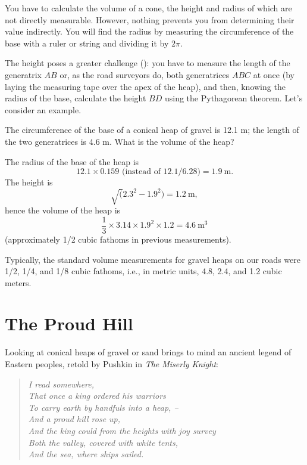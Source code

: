 You have to calculate the volume of a cone, the height and radius of which are not directly measurable. However, nothing prevents you from determining their value indirectly. You will find the radius by measuring the circumference of the base with a ruler or string and dividing it by $2\pi$. 

The height poses a greater challenge (): you have to measure the length of the generatrix $AB$ or, as the road surveyors do, both generatrices $ABC$ at once (by laying the measuring tape over the apex of the heap), and then, knowing the radius of the base, calculate the height $BD$ using the Pythagorean theorem. Let's consider an example.

\ques The circumference of the base of a conical heap of gravel is 12.1 m; the length of the two generatrices is 4.6 m. What is the volume of the heap?

\ans The radius of the base of the heap is 
\begin{equation*}%
12.1 \times 0.159 \,\, \text{(instead of 12.1/6.28)} = \SI{1.9}{\meter}.
\end{equation*}
The height is 
\begin{equation*}%
\sqrt(2.3^{2} - 1.9^{2}) =  \SI{1.2}{\meter},
\end{equation*}
hence the volume of the heap is 
\begin{equation*}%
\frac{1}{3} \times 3.14 \times 1.9^{2} \times 1.2 =  \SI{4.6}{\meter\cubed}
\end{equation*}
(approximately 1/2 cubic fathoms in previous measurements).

Typically, the standard volume measurements for gravel heaps on our roads were 1/2, 1/4, and 1/8 cubic fathoms, i.e., in metric units, 4.8, 2.4, and 1.2 cubic meters.


\section{The Proud Hill}
\label{sec-4.5}

Looking at conical heaps of gravel or sand brings to mind an ancient legend of Eastern peoples, retold by Pushkin in \emph{The Miserly Knight}:

\begin{quote}
\emph{I read somewhere,\\
That once a king ordered his warriors\\
To carry earth by handfuls into a heap, --\\
And a proud hill rose up,\\
And the king could from the heights with joy survey\\
Both the valley, covered with white tents,\\
And the sea, where ships sailed.}
\end{quote}

